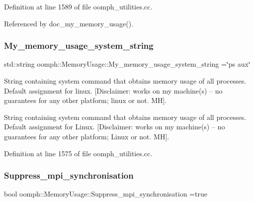 Definition at line 1589 of file oomph\+\_\+utilities.\+cc.



Referenced by doc\+\_\+my\+\_\+memory\+\_\+usage().

\mbox{\label{namespaceoomph_1_1MemoryUsage_ae5280b46bc1ce506ba96494d6dacbdbe}} 
\subsubsection{\texorpdfstring{My\+\_\+memory\+\_\+usage\+\_\+system\+\_\+string}{My\_memory\_usage\_system\_string}}
{\footnotesize\ttfamily std\+::string oomph\+::\+Memory\+Usage\+::\+My\+\_\+memory\+\_\+usage\+\_\+system\+\_\+string =\char`\"{}ps aux\char`\"{}}



String containing system command that obtains memory usage of all processes. Default assignment for linux. \mbox{[}Disclaimer\+: works on my machine(s) -- no guarantees for any other platform; linux or not. MH\mbox{]}. 

String containing system command that obtains memory usage of all processes. Default assignment for Linux. \mbox{[}Disclaimer\+: works on my machine(s) -- no guarantees for any other platform; Linux or not. MH\mbox{]}. 

Definition at line 1575 of file oomph\+\_\+utilities.\+cc.

\mbox{\label{namespaceoomph_1_1MemoryUsage_a77ed83cae1c77e9a046bc6b1ff55645a}} 
\subsubsection{\texorpdfstring{Suppress\+\_\+mpi\+\_\+synchronisation}{Suppress\_mpi\_synchronisation}}
{\footnotesize\ttfamily bool oomph\+::\+Memory\+Usage\+::\+Suppress\+\_\+mpi\+\_\+synchronisation =true}



